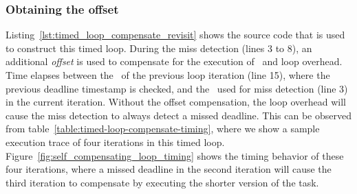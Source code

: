 \subsubsection{Obtaining the offset}
Listing~\ref{lst:timed_loop_compensate_revisit} shows the source code that is used to construct this timed loop. 
During the miss detection (lines 3 to 8), an additional \textit{offset} is used to compensate for the execution of \delayuntil\ and loop overhead.
Time elapses between the \delayuntil\ of the previous loop iteration (line 15), where the previous deadline timestamp is checked, and the \gettime\ used for miss detection (line 3) in the current iteration.
Without the offset compensation, the loop overhead will cause the miss detection to always detect a missed deadline.
This can be observed from table~\ref{table:timed-loop-compensate-timing}, where we show a sample execution trace of four iterations in this timed loop.  
Figure~\ref{fig:self_compensating_loop_timing} shows the timing behavior of these four iterations, where a missed deadline in the second iteration will cause the third iteration to compensate by executing the shorter version of the task.


